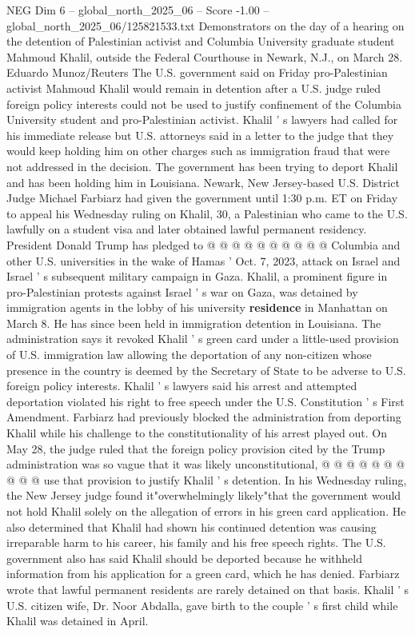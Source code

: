 \begin{textsample}{NEG Dim 6 – global\_north\_2025\_06 – Score -1.00 – global\_north\_2025\_06/125821533.txt}  \label{ex:f6_neg_429}
Demonstrators on the day of a hearing on the detention of Palestinian activist and Columbia University graduate student Mahmoud Khalil, outside the Federal Courthouse in Newark, N.J., on March 28.
Eduardo Munoz/Reuters The U.S. government said on Friday pro-Palestinian activist Mahmoud Khalil would remain in detention after a U.S. judge ruled foreign policy interests could not be used to justify confinement of the Columbia University student and pro-Palestinian activist.
Khalil ' s lawyers had called for his immediate release but U.S. attorneys said in a letter to the judge that they would keep holding him on other charges such as immigration fraud that were not addressed in the decision.
The government has been trying to deport Khalil and has been holding him in Louisiana.
Newark, New Jersey-based U.S.
District Judge Michael Farbiarz had given the government until 1:30 p.m.
ET on Friday to appeal his Wednesday ruling on Khalil, 30, a Palestinian who came to the U.S. lawfully on a student visa and later obtained lawful permanent residency.
President Donald Trump has pledged to @ @ @ @ @ @ @ @ @ @ Columbia and other U.S. universities in the wake of Hamas ' Oct. 7, 2023, attack on Israel and Israel ' s subsequent military campaign in Gaza.
Khalil, a prominent figure in pro-Palestinian protests against Israel ' s war on Gaza, was detained by immigration agents in the lobby of his university \textbf{residence} in Manhattan on March 8.
He has since been held in immigration detention in Louisiana.
The administration says it revoked Khalil ' s green card under a little-used provision of U.S. immigration law allowing the deportation of any non-citizen whose presence in the country is deemed by the Secretary of State to be adverse to U.S. foreign policy interests.
Khalil ' s lawyers said his arrest and attempted deportation violated his right to free speech under the U.S.
Constitution ' s First Amendment.
Farbiarz had previously blocked the administration from deporting Khalil while his challenge to the constitutionality of his arrest played out.
On May 28, the judge ruled that the foreign policy provision cited by the Trump administration was so vague that it was likely unconstitutional, @ @ @ @ @ @ @ @ @ @ use that provision to justify Khalil ' s detention.
In his Wednesday ruling, the New Jersey judge found it"overwhelmingly likely"that the government would not hold Khalil solely on the allegation of errors in his green card application.
He also determined that Khalil had shown his continued detention was causing irreparable harm to his career, his family and his free speech rights.
The U.S. government also has said Khalil should be deported because he withheld information from his application for a green card, which he has denied.
Farbiarz wrote that lawful permanent residents are rarely detained on that basis.
Khalil ' s U.S. citizen wife, Dr.
Noor Abdalla, gave birth to the couple ' s first child while Khalil was detained in April.

\end{textsample}
